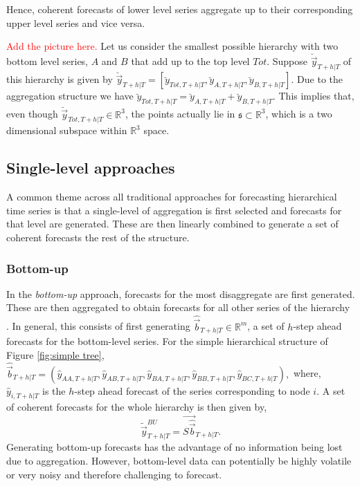 \documentclass[graybox]{svmult}
\begin{document}
Hence, coherent forecasts of lower level series aggregate up to their corresponding upper level series and vice versa.

\textcolor{red}{Add the picture here.}
Let us consider the smallest possible hierarchy with two bottom level series, $A$ and $B$ that add up to the top level $Tot$. Suppose $\breve{\vec{y}}_{T+h|T}$ of this hierarchy is given by $\breve{\vec{y}}_{T+h|T} = [\breve{y}_{Tot,T+h|T},\breve{y}_{A,T+h|T}, \breve{y}_{B,T+h|T}]$. Due to the aggregation structure we have $\breve{y}_{Tot,T+h|T}=\breve{y}_{A,T+h|T}+\breve{y}_{B,T+h|T}$. This implies that, even though  $\breve{\vec{y}}_{Tot,T+h|T} \in \mathbb{R}^3$, the points actually lie in $\mathfrak{s}\subset \mathbb{R}^3$, which is a two dimensional subspace within $\mathbb{R}^3$ space.

\subsection{Single-level approaches}\label{sec:single level approaches}
A common theme across all traditional approaches for forecasting hierarchical time series is that a single-level of aggregation is first selected and forecasts for that level are generated. These are then linearly combined to generate a set of coherent forecasts the rest of the structure.

\subsubsection{Bottom-up}

In the \textit{bottom-up} approach, forecasts for the most disaggregate are first generated. These are then aggregated to obtain forecasts for all other series of the hierarchy \citep{dunn1976}. In general, this consists of first generating $\hat{\vec{b}}_{T+h|T} \in \mathbb{R}^m$, a set of $h$-step ahead forecasts for the bottom-level series. For the simple hierarchical structure of Figure \ref{fig:simple tree}, $\hat{\vec{b}}_{T+h|T} = (\hat{{y}}_{AA,T+h|T}, \hat{{y}}_{AB,T+h|T}, \hat{{y}}_{BA,T+h|T}, \hat{{y}}_{BB,T+h|T},\hat{{y}}_{BC,T+h|T}),$ where, $\hat{{y}}_{i,T+h|T}$ is the $h$-step ahead forecast of the series corresponding to node $i$. A set of coherent forecasts for the whole hierarchy is then given by,
\begin{equation*}\label{eq:BU}
\tilde{\vec{y}}^{BU}_{T+h|T}=\vec{S\hat{\vec{b}}}_{T+h|T}.
\end{equation*}
Generating bottom-up forecasts has the advantage of no information being lost due to aggregation. However, bottom-level data can potentially be highly volatile or very noisy and therefore challenging to forecast.
\end{document}
